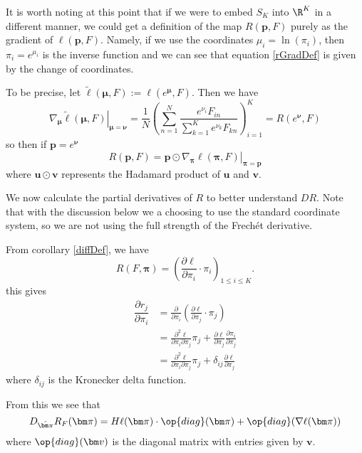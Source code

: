 It is worth noting at this point that if we were to embed $S_K$ into $\R^{K}$ in a different manner, we could get a definition of the map $R(\bm p,F)$ purely as the gradient of $\ell(\bm p,F)$.  Namely, if we use the coordinates $\mu_i=\ln(\pi_i)$, then $\pi_i=e^{\mu_i}$ is the inverse function and we can see that equation \ref{rGradDef} is given by the change of coordinates.  %

To be precise, let $\tilde{\ell}(\bm\mu,F):=\ell(e^{\bm\mu},F)$. Then we have 
\[\left.\nabla_{\bm \mu}\tilde{\ell}(\bm\mu,F)\right|_{\bm\mu=\bm\nu}=\frac{1}{N}\left(\sum_{n=1}^{N}\frac{e^{\nu_i}F_{in}}{\sum\limits_{k=1}^{K}e^{\nu_k}F_{kn}}\right)_{i=1}^{K}=R(e^{\bm\nu},F)\]
so then if $\bm p=e^{\bm\nu}$
\[R(\bm p,F)=\bm p\odot\left.\nabla_{\bm\pi}\ell(\bm\pi,F)\right|_{\bm\pi=\bm p}\]
where $\bm u\odot \bm v$ represents the Hadamard product of $\bm u$ and $\bm v$.

We now calculate the partial derivatives of $R$ to better understand $DR$.  Note that  with the discussion below we a choosing to use the standard coordinate system, so we are not using the full strength of the Frech\'et derivative.

From corollary \ref{diffDef}, we have
\[R(F,\bm\pi)=\left(\frac{\partial\ell}{\partial\pi_i}\cdot\pi_i\right)_{1\leq i\leq K}.\]
this gives
\begin{align*}
	\dfrac{\partial r_j}{\partial \pi_i}&=\frac{\partial}{\partial \pi_i}\left(\frac{\partial\ell}{\partial\pi_j}\cdot\pi_j\right) \\
										&=\frac{\partial^2\ell}{\partial \pi_i\partial\pi_j}\pi_j+\frac{\partial\ell}{\partial\pi_j} \frac{\partial\pi_i}{\partial\pi_j} \\
										&=\frac{\partial^2\ell}{\partial \pi_i\partial\pi_j}\pi_j+\delta_{ij}\frac{\partial\ell}{\partial\pi_j}
\end{align*}
where $\delta_{ij}$ is the Kronecker delta function.

From this we see that 
\[D_{\hat{\bm\pi}}R_F(\bm\pi)= H\ell(\bm\pi)\cdot\op{diag}(\bm\pi)+\op{diag}(\nabla\ell(\bm\pi))\]
where $\op{diag}(\bm v)$ is the diagonal matrix with entries given by $\bm v$. 

